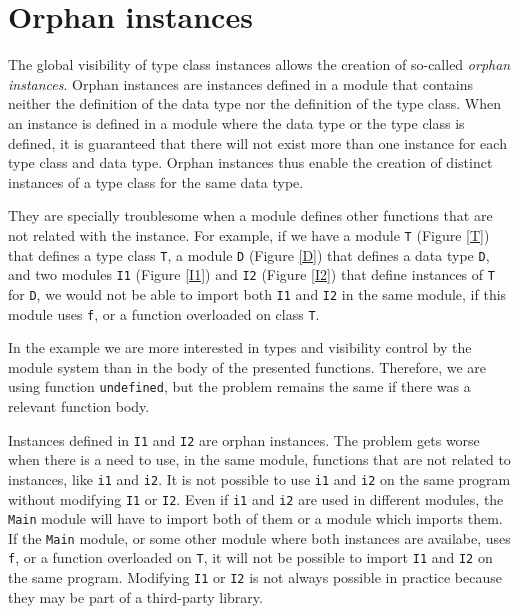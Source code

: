 \documentclass[msc]{ppgccufmg}
\begin{document}
\section{Orphan instances}
\label{Orphan-instances}

The global visibility of type class instances allows the creation of so-called {\em
  orphan instances\/}.  Orphan instances are instances defined in a
module that contains neither the definition of the data type nor the
definition of the type class.  When an instance is defined in a module
where the data type or the type class is defined, it is guaranteed
that there will not exist more than one instance for each type class
and data type.  Orphan instances thus enable the
creation of distinct instances of a type class for the same data type.

They are specially troublesome when a module defines other functions that are
not related with the instance.  For example, if we have a module \texttt{T}
(Figure \ref{T}) that defines a type class \texttt{T}, a module \texttt{D} (Figure \ref{D}) that defines a data
type \texttt{D}, and two modules \texttt{I1} (Figure \ref{I1}) and
\texttt{I2} (Figure \ref{I2}) that define
instances of \texttt{T} for \texttt{D}, we would not be able to import both
\texttt{I1} and \texttt{I2} in the same
module, if this module uses \texttt{f}, or a function overloaded on
  class \texttt{T}.

In the example we are more interested in types and visibility control
by the module system than in the body of the presented functions.
Therefore, we are using function \texttt{undefined}, but the problem
remains the same if there was a relevant function body.

Instances defined in \texttt{I1} and \texttt{I2} are orphan instances.
The problem gets worse when there is a need to use, in the same
module, functions that are not related to instances, like \texttt{i1}
and \texttt{i2}.  It is not possible to use \texttt{i1} and \texttt{i2} on
the same program without modifying \texttt{I1} or \texttt{I2}. Even if \texttt{i1}
and \texttt{i2} are used in different modules, the \texttt{Main} module will
have to import both of them or a module which imports them.  If the
\texttt{Main} module, or some other module where both instances are availabe,
uses \texttt{f}, or a function overloaded on \texttt{T}, it will not be possible
to import \texttt{I1} and \texttt{I2} on the same program.  Modifying
\texttt{I1} or \texttt{I2} is not always possible in practice because they
may be part of a third-party library.
\end{document}
